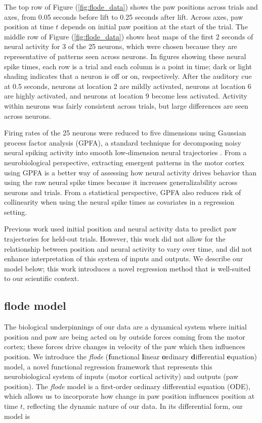 \documentclass[preprint]{JASA}
\begin{document}
The top row of Figure (\ref{fig:flode_data}) shows the paw positions
across trials and axes, from 0.05 seconds before lift to 0.25 seconds
after lift. Across axes, paw position at time \(t\) depends on initial
paw position at the start of the trial. The middle row of Figure
(\ref{fig:flode_data}) shows heat maps of the first 2 seconds of neural
activity for 3 of the 25 neurons, which were chosen because they are
representative of patterns seen across neurons. In figures showing these
neural spike times, each row is a trial and each column is a point in
time; dark or light shading indicates that a neuron is off or on,
respectively. After the auditory cue at 0.5 seconds, neurons at location
2 are mildly activated, neurons at location 6 are highly activated, and
neurons at location 9 become less activated. Activity within neurons was
fairly consistent across trials, but large differences are seen across
neurons.

Firing rates of the 25 neurons were reduced to five dimensions using
Gaussian process factor analysis (GPFA), a standard technique for
decomposing noisy neural spiking activity into smooth low-dimension
neural trajectories \citep{yu2009}. From a neurobiological perspective,
extracting emergent patterns in the motor cortex using GPFA is a better
way of assessing how neural activity drives behavior than using the raw
neural spike times because it increases generalizability across neurons
and trials. From a statistical perspective, GPFA also reduces risk of
collinearity when using the neural spike times as covariates in a
regression setting.

Previous work used initial position and neural activity data to predict
paw trajectories for held-out trials. However, this work did not allow
for the relationship between position and neural activity to vary over
time, and did not enhance interpretation of this system of inputs and
outputs. We describe our model below; this work introduces a novel
regression method that is well-suited to our scientific context.

\hypertarget{flode-model}{%
\subsection{flode model}\label{flode-model}}

\label{sec:flode}

The biological underpinnings of our data are a dynamical system where
initial position and paw are being acted on by outside forces coming
from the motor cortex; these forces drive changes in velocity of the paw
which then influences position. We introduce the \emph{flode}
(\textbf{f}unctional \textbf{l}inear \textbf{o}rdinary
\textbf{d}ifferential \textbf{e}quation) model, a novel functional
regression framework that represents this neurobiological system of
inputs (motor cortical activity) and outputs (paw position). The
\emph{flode} model is a first-order ordinary differential equation
(ODE), which allows us to incorporate how change in paw position
influences position at time \(t\), reflecting the dynamic nature of our
data. In its differential form, our model is
\end{document}
